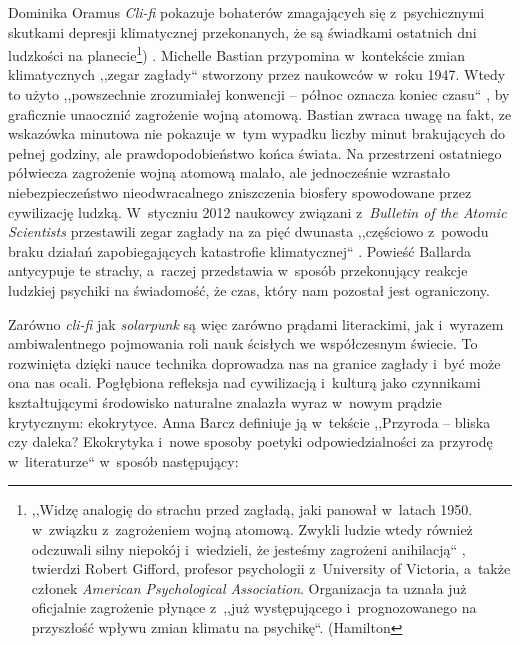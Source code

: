 \begin{artplenv}{Dominika Oramus}
\textit{Cli-fi} pokazuje bohaterów zmagających się z~psychicznymi skutkami depresji klimatycznej przekonanych, że są świadkami ostatnich dni ludzkości na planecie\footnote{,,Widzę analogię do strachu przed zagładą, jaki panował w~latach 1950. w~związku z~zagrożeniem wojną atomową. Zwykli ludzie wtedy również odczuwali silny niepokój i~wiedzieli, że jesteśmy zagrożeni anihilacją``
\parencite[][]{hamilton_climate_2016}, %
 twierdzi Robert Gifford, profesor psychologii z~University of Victoria, a~także członek \textit{American Psychological Association}. Organizacja ta uznała już oficjalnie zagrożenie płynące z~,,już występującego i~prognozowanego na przyszłość wpływu zmian klimatu na psychikę``. (Hamilton}) . Michelle Bastian przypomina w~kontekście zmian klimatycznych ,,zegar zagłady`` stworzony przez naukowców w~roku 1947. Wtedy to użyto ,,powszechnie zrozumiałej konwencji -- północ oznacza koniec czasu`` 
\parencite[][s.~39]{bastian_fatally_2012}, %
 by graficznie unaocznić zagrożenie wojną atomową. Bastian zwraca uwagę na fakt, ze wskazówka minutowa nie pokazuje w~tym wypadku liczby minut brakujących do pełnej godziny, ale prawdopodobieństwo końca świata. Na przestrzeni ostatniego półwiecza zagrożenie wojną atomową malało, ale jednocześnie wzrastało niebezpieczeństwo nieodwracalnego zniszczenia biosfery spowodowane przez cywilizację ludzką. W~styczniu 2012 naukowcy związani z~\textit{Bulletin of the Atomic Scientists} przestawili zegar zagłady na za pięć dwunasta ,,częściowo z~powodu braku działań zapobiegających katastrofie klimatycznej`` 
\parencite[][s.~39]{bastian_fatally_2012}. %
 Powieść Ballarda antycypuje te strachy, a~raczej przedstawia w~sposób przekonujący reakcje ludzkiej psychiki na świadomość, że czas, który nam pozostał jest ograniczony.

Zarówno \textit{cli-fi} jak \textit{solarpunk} są więc zarówno prądami literackimi, jak i~wyrazem ambiwalentnego pojmowania roli nauk ścisłych we współczesnym świecie. To rozwinięta dzięki nauce technika doprowadza nas na granice zagłady i~być może ona nas ocali. Pogłębiona refleksja nad cywilizacją i~kulturą jako czynnikami kształtującymi środowisko naturalne znalazła wyraz w~nowym prądzie krytycznym: ekokrytyce. Anna Barcz definiuje ją w~tekście ,,Przyroda -- bliska czy daleka? Ekokrytyka i~nowe sposoby poetyki odpowiedzialności za przyrodę w~literaturze`` w~sposób następujący:


\end{artplenv}
